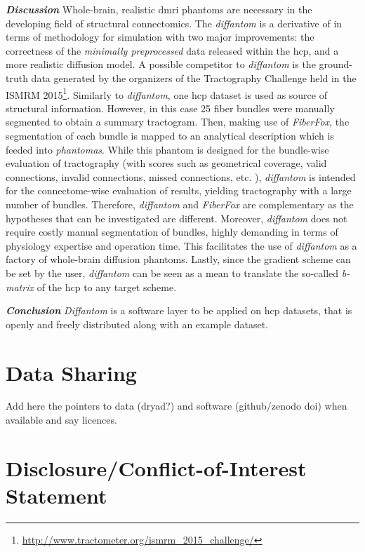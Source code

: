 \documentclass[english]{frontiers/frontiersSCNS} %
\begin{document}
\noindent\textbf{\textit{Discussion\textcolon}}\label{sec:discussion} %
Whole-brain, realistic \gls*{dmri} phantoms are necessary in the developing field of structural
  connectomics.
The \emph{diffantom} is a derivative of \citep{wilkins_fiber_2014} in terms of methodology for
  simulation with two major improvements: the correctness of the \emph{minimally preprocessed} data
  \citep{glasser_minimal_2013} released within the \gls*{hcp}, and a more realistic diffusion
  model.
A possible competitor to \emph{diffantom} is the ground-truth data generated by the organizers of the
  Tractography Challenge held in the ISMRM 2015\footnote{\url{http://www.tractometer.org/ismrm_2015_challenge/}}.
Similarly to \emph{diffantom}, one \gls*{hcp} dataset is used as source of structural information.
However, in this case 25 fiber bundles were manually segmented to obtain a summary tractogram.
Then, making use of \emph{FiberFox}, the segmentation of each bundle is mapped to an analytical description
  which is feeded into \emph{phantomas}.
While this phantom is designed for the bundle-wise evaluation of tractography (with scores such as geometrical coverage,
  valid connections, invalid connections, missed connections, etc. \citep{cote_tractometer_2013}),
  \emph{diffantom} is intended for the connectome-wise evaluation of results, yielding tractography with
  a large number of bundles.
Therefore, \emph{diffantom} and \emph{FiberFox} are complementary as the hypotheses that can be investigated are different.
Moreover, \emph{diffantom} does not require costly manual segmentation of bundles, highly demanding in terms of physiology
  expertise and operation time.
This facilitates the use of \emph{diffantom} as a factory of whole-brain diffusion phantoms.
Lastly, since the gradient scheme can be set by the user, \emph{diffantom} can be seen as a mean to translate the so-called
  \emph{b-matrix} of the \gls*{hcp} to any target scheme.

\noindent\textbf{\textit{Conclusion\textcolon}}\label{sec:conclusion} %
\emph{Diffantom} is a software layer to be applied on \acrfull*{hcp} datasets, that is openly and freely distributed
  along with an example dataset.


\section*{Data Sharing}
{\color{red} Add here the pointers to data (dryad?) and software (github/zenodo doi) when available and say licences.}

\section*{Disclosure/Conflict-of-Interest Statement}
\end{document}
